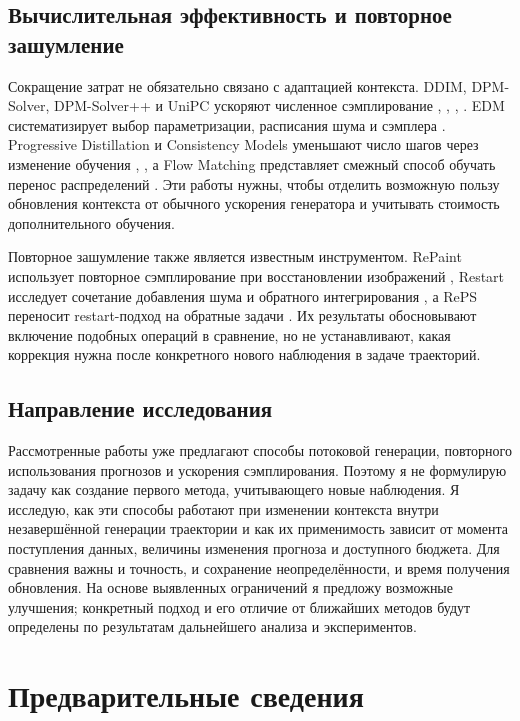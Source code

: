 \subsection{Вычислительная эффективность и повторное зашумление}

Сокращение затрат не обязательно связано с адаптацией контекста. DDIM, DPM-Solver, DPM-Solver++ и UniPC ускоряют численное сэмплирование \citep{p30}, \citep{p31}, \citep{p32}, \citep{p33}. EDM систематизирует выбор параметризации, расписания шума и сэмплера \citep{p36}. Progressive Distillation и Consistency Models уменьшают число шагов через изменение обучения \citep{p35}, \citep{p34}, а Flow Matching представляет смежный способ обучать перенос распределений \citep{p39}. Эти работы нужны, чтобы отделить возможную пользу обновления контекста от обычного ускорения генератора и учитывать стоимость дополнительного обучения.

Повторное зашумление также является известным инструментом. RePaint использует повторное сэмплирование при восстановлении изображений \citep{p27}, Restart исследует сочетание добавления шума и обратного интегрирования \citep{p25}, а RePS переносит restart-подход на обратные задачи \citep{p26}. Их результаты обосновывают включение подобных операций в сравнение, но не устанавливают, какая коррекция нужна после конкретного нового наблюдения в задаче траекторий.

\subsection{Направление исследования}

Рассмотренные работы уже предлагают способы потоковой генерации, повторного использования прогнозов и ускорения сэмплирования. Поэтому я не формулирую задачу как создание первого метода, учитывающего новые наблюдения. Я исследую, как эти способы работают при изменении контекста внутри незавершённой генерации траектории и как их применимость зависит от момента поступления данных, величины изменения прогноза и доступного бюджета. Для сравнения важны и точность, и сохранение неопределённости, и время получения обновления. На основе выявленных ограничений я предложу возможные улучшения; конкретный подход и его отличие от ближайших методов будут определены по результатам дальнейшего анализа и экспериментов.


\clearpage
\section{Предварительные сведения}\label{sec:prelim}
